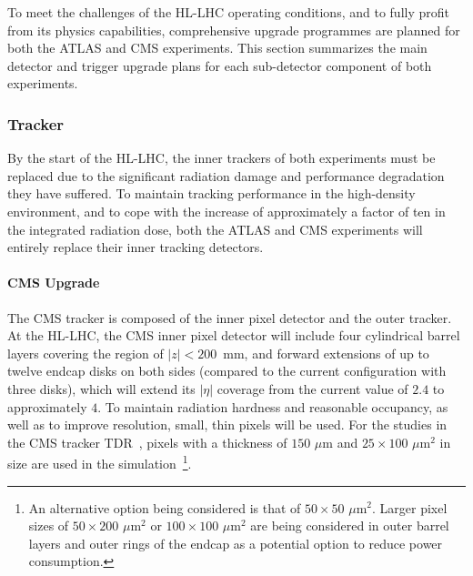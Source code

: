 To meet the challenges of the HL-LHC operating conditions, and to fully profit from its physics capabilities, comprehensive upgrade programmes are planned for both the ATLAS and CMS experiments. This section summarizes the main detector and trigger upgrade plans for each sub-detector component of both experiments. 

\subsubsection{Tracker} \label{sec:upgradetracker}

By the start of the HL-LHC, the inner trackers of both experiments must be replaced due to the significant radiation damage and performance degradation they have suffered. To maintain tracking performance in the high-density environment, and to cope with the increase of approximately a factor of ten in the integrated radiation dose, both the ATLAS and CMS experiments will entirely replace their inner tracking detectors.  

\paragraph{CMS Upgrade} 
The CMS tracker is composed of the inner pixel detector and the outer tracker. At the HL-LHC, the CMS inner pixel detector will include four cylindrical barrel layers covering the region of $|z| < 200$~mm, and forward extensions of up to twelve endcap disks on both sides (compared to the current configuration with three disks), which will extend its $|\eta|$ coverage from the current value of $2.4$ to approximately $4$. To maintain radiation hardness and reasonable occupancy, as well as to improve resolution, small, thin pixels will be used. For the studies in the CMS tracker TDR~\cite{Collaboration:2272264}, pixels with a thickness of $150\,\, \mu \mathrm{m}$ and $25\times100\,\,{\mu \mathrm{m}}^2$ in size are used in the simulation~\footnote{An alternative option being considered is that of $50\times50\,\,{\mu \mathrm{m}}^2$. Larger pixel sizes of $50\times200\,\,{\mu \mathrm{m}}^2$ or $100\times100\,\,{\mu \mathrm{m}}^2$ are being considered in outer barrel layers and outer rings of the endcap as a potential option to reduce power consumption.}.

